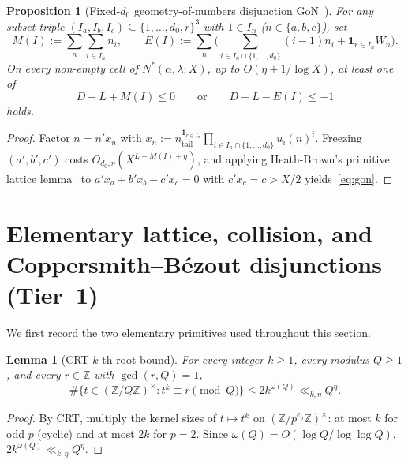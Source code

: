 \documentclass[11pt,a4paper]{amsart}
\theoremstyle{plain}
\newtheorem{proposition}[theorem]{Proposition}
\newtheorem{lemma}[theorem]{Lemma}
\theoremstyle{definition}
\theoremstyle{remark}
\newcommand{\Z}{\mathbb{Z}}
\begin{document}
\begin{proposition}[Fixed-$d_0$ geometry-of-numbers disjunction \textsf{GoN}~\cite{BLT2026}]\label{prop:gon}
For any subset triple $(I_a,I_b,I_c) \subseteq \{1,\dots,d_0,r\}^3$ with $1 \in I_n$ ($n \in \{a,b,c\}$), set
\[
  M(I) := \sum_n \sum_{i \in I_n} n_i, \qquad
  E(I) := \sum_n \biggl(\sum_{i \in I_n \cap \{1,\dots,d_0\}} (i-1) n_i + \mathbf{1}_{r \in I_n} W_n\biggr).
\]
On every non-empty cell of $N^*(\alpha,\lambda;X)$, up to $O(\eta + 1/\log X)$, at least one of
\begin{equation}\label{eq:gon}
  D - L + M(I) \le 0 \qquad\text{or}\qquad D - L - E(I) \le -1
\end{equation}
holds.
\end{proposition}
\begin{proof}
Factor $n = n' x_n$ with $x_n := n_{\mathrm{tail}}^{\mathbf{1}_{r \in I_n}} \prod_{i \in I_n \cap \{1,\dots,d_0\}} u_i(n)^i$. Freezing $(a',b',c')$ costs $O_{d_0,\eta}(X^{L-M(I)+\eta})$, and applying Heath-Brown's primitive lattice lemma~\cite[Lemma~3]{HeathBrown1984} to $a' x_a + b' x_b - c' x_c = 0$ with $c' x_c = c > X/2$ yields~\eqref{eq:gon}.
\end{proof}

\section{Elementary lattice, collision, and Coppersmith--B\'ezout disjunctions (Tier~1)}\label{sec:tier1}

We first record the two elementary primitives used throughout this section.

\begin{lemma}[CRT $k$-th root bound]\label{lem:crt}
For every integer $k \ge 1$, every modulus $Q \ge 1$, and every $r \in \Z$ with $\gcd(r,Q) = 1$,
\[
  \#\bigl\{t \in (\Z/Q\Z)^\times : t^k \equiv r \pmod Q\bigr\} \le 2 k^{\omega(Q)} \ll_{k,\eta} Q^\eta.
\]
\end{lemma}
\begin{proof}
By CRT, multiply the kernel sizes of $t \mapsto t^k$ on $(\Z/p^{e_p}\Z)^\times$: at most $k$ for odd $p$ (cyclic) and at most $2k$ for $p = 2$. Since $\omega(Q) = O(\log Q / \log\log Q)$, $2 k^{\omega(Q)} \ll_{k,\eta} Q^\eta$.
\end{proof}
\end{document}
